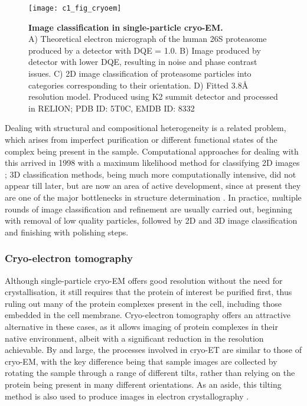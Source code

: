 \documentclass[a4paper,11pt,twoside,openright]{scrbook}
\begin{document}
\begin{figure}
    \texttt{[image: c1\_fig\_cryoem]}
    \caption[Image classification in single-particle cryo-EM]{\sffamily \textbf{Image classification in single-particle cryo-EM.} \\ \small A) Theoretical electron micrograph of the human 26S proteasome produced by a detector with DQE = 1.0. B) Image produced by detector with lower DQE, resulting in noise and phase contrast issues. C) 2D image classification of proteasome particles into categories corresponding to their orientation. D) Fitted 3.8Å resolution model. Produced using K2 summit detector and processed in RELION; PDB ID: 5T0C, EMDB ID: 8332 \cite{Chen2016}}
    \label{figure:cryoem}
\end{figure}

Dealing with structural and compositional heterogeneity is a related problem, which arises from imperfect purification or different functional states of the complex being present in the sample. Computational approaches for dealing with this arrived in 1998 with a maximum likelihood method for classifying 2D images \cite{Sigworth1998}; 3D classification methods, being much more computationally intensive, did not appear till later, but are now an area of active development, since at present they are one of the major bottlenecks in structure determination \cite{Scheres2007,Lyumkis2013,Punjani2017}. In practice, multiple rounds of image classification and refinement are usually carried out, beginning with removal of low quality particles, followed by 2D and 3D image classification and finishing with polishing steps.

\subsubsection{Cryo-electron tomography}
Although single-particle cryo-EM offers good resolution without the need for crystallisation, it still requires that the protein of interest be purified first, thus ruling out many of the protein complexes present in the cell, including those embedded in the cell membrane. Cryo-electron tomography offers an attractive alternative in these cases, as it allows imaging of protein complexes in their native environment, albeit with a significant reduction in the resolution achievable. By and large, the processes involved in cryo-ET are similar to those of cryo-EM, with the key difference being that sample images are collected by rotating the sample through a range of different tilts, rather than relying on the protein being present in many different orientations. As an aside, this tilting method is also used to produce images in electron crystallography \cite{Wisedchaisri2011}.
\end{document}

